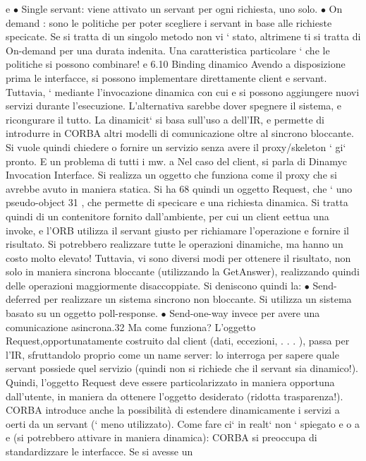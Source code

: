 \documentclass[a4paper,12pt]{article}
\begin{document}
e
$\bullet$ Single servant: viene attivato un servant per ogni richiesta, uno solo.
$\bullet$ On demand : sono le politiche per poter scegliere i servant in base alle richieste specicate. Se si tratta di
un singolo metodo non vi ` stato, altrimene
ti si tratta di On-demand per una durata indenita. Una caratteristica
particolare ` che le politiche si possono combinare!
e
6.10
Binding dinamico
Avendo a disposizione prima le interfacce, si possono implementare direttamente client e servant. Tuttavia, ` mediante
l'invocazione dinamica con cui
e
si possono aggiungere nuovi servizi durante l'esecuzione. L'alternativa sarebbe
dover spegnere il sistema, e ricongurare il tutto. La dinamicit` si basa sull'uso
a
dell'IR, e permette di introdurre in CORBA altri modelli di comunicazione oltre
al sincrono bloccante.
Si vuole quindi chiedere o fornire un servizio senza avere il proxy/skeleton
`
gi` pronto. E un problema di tutti i mw.
a
Nel caso del client, si parla di Dinamyc Invocation Interface. Si realizza un
oggetto che funziona come il proxy che si avrebbe avuto in maniera statica. Si ha
68
quindi un oggetto Request, che ` uno pseudo-object 31 , che permette di specicare
e
una richiesta dinamica. Si tratta quindi di un contenitore fornito dall'ambiente,
per cui un client eettua una invoke, e l'ORB utilizza il servant giusto per
richiamare l'operazione e fornire il risultato. Si potrebbero realizzare tutte le
operazioni dinamiche, ma hanno un costo molto elevato! Tuttavia, vi sono
diversi modi per ottenere il risultato, non solo in maniera sincrona bloccante
(utilizzando la GetAnswer), realizzando quindi delle operazioni maggiormente
disaccoppiate. Si deniscono quindi la:
$\bullet$ Send-deferred per realizzare un sistema sincrono non bloccante. Si utilizza
un sistema basato su un oggetto poll-response.
$\bullet$ Send-one-way invece per avere una comunicazione asincrona.32
Ma come funziona? L'oggetto Request,opportunatamente costruito dal client
(dati, eccezioni, . . . ), passa per l'IR, sfruttandolo proprio come un name server: lo interroga per sapere quale
servant possiede quel servizio (quindi non si
richiede che il servant sia dinamico!). Quindi, l'oggetto Request deve essere particolarizzato in maniera opportuna
dall'utente, in maniera da ottenere l'oggetto
desiderato (ridotta trasparenza!).
CORBA introduce anche la possibilità di estendere dinamicamente i servizi
a
oerti da un servant (` meno utilizzato). Come fare ci` in realt` non ` spiegato
e
o
a
e
(si potrebbero attivare in maniera dinamica): CORBA si preoccupa di standardizzare le interfacce. Se si avesse un
\end{document}
